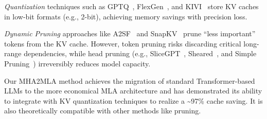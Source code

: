 \textit{Quantization} techniques such as GPTQ~\cite{corr/abs-2210-17323}, FlexGen~\cite{icml/0007ZYLRCLRSZ23}, and KIVI~\cite{icml/LiuYJZXBC024} store KV caches in low-bit formats (e.g., 2-bit), achieving memory savings with precision loss.  

\textit{Dynamic Pruning} approaches like A2SF~\cite{corr/abs-2407-20485} and SnapKV~\cite{nips/LiHYVLYCLC24} prune ``less important'' tokens from the KV cache. However, token pruning risks discarding critical long-range dependencies, while head pruning (e.g., SliceGPT~\cite{iclr/AshkboosCNHH24}, Sheared~\cite{conf/iclr/XiaGZ024}, and Simple Pruning~\cite{conf/iclr/Sun0BK24}) irreversibly reduces model capacity.  

Our MHA2MLA method achieves the migration of standard Transformer-based LLMs to the more economical MLA architecture and has demonstrated its ability to integrate with KV quantization techniques to realize a \textasciitilde 97\% cache saving. It is also theoretically compatible with other methods like pruning. 
